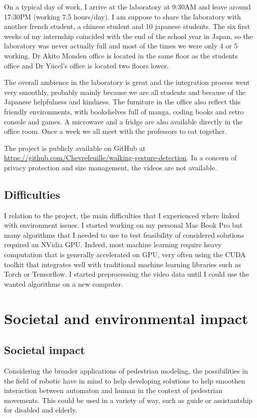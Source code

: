 \documentclass[12pt,a4paper,twoside]{article}
\begin{document}
On a typical day of work, I arrive at the laboratory at 9:30AM and leave around 17:30PM (working 7.5 hours/day). I am suppose to share the laboratory with another french student, a chinese student and 10 japanese students. The six first weeks of my internship coincided with the end of the school year in Japan, so the laboratory was never actually full and most of the times we were only 4 or 5 working. Dr Akito Monden office is located in the same floor as the students office and Dr Yücel's office is located two floors lower. 

The overall ambience in the laboratory is great and the integration process went very smoothly, probably mainly because we are all students and because of the Japanese helpfulness and kindness. The furniture in the office also reflect this friendly environments, with bookshelves full of manga, coding books and retro console and games. A microwave and a fridge are also available directly in the office room. Once a week we all meet with the professors to eat together.

The project is publicly available on GitHub at \url{https://github.com/Chevrefeuille/walking-gesture-detection}. In a concern of privacy protection and size management, the videos are not available.

\subsection{Difficulties}
I relation to the project, the main difficulties that I experienced where linked with environment issues. I started working on my personal Mac Book Pro but many algorithms that I needed to use to test feasibility of considered solutions required an NVidia GPU. Indeed, most machine learning require heavy computation that is generally accelerated on GPU, very often using the CUDA toolkit that integrates well with traditional machine learning libraries such as Torch or Tensorflow. I started preprocessing the video data until I could use the wanted algorithms on a new computer.

\newpage

\section{Societal and environmental impact}

\subsection{Societal impact}
Considering the broader applications of pedestrian modeling, the possibilities in the field of robotic have in mind to help developing solutions to help smoothen interaction between automaton and human in the context of pedestrian movements. This could be used in a variety of way, such as guide or assistantship for disabled and elderly. 
\end{document}
